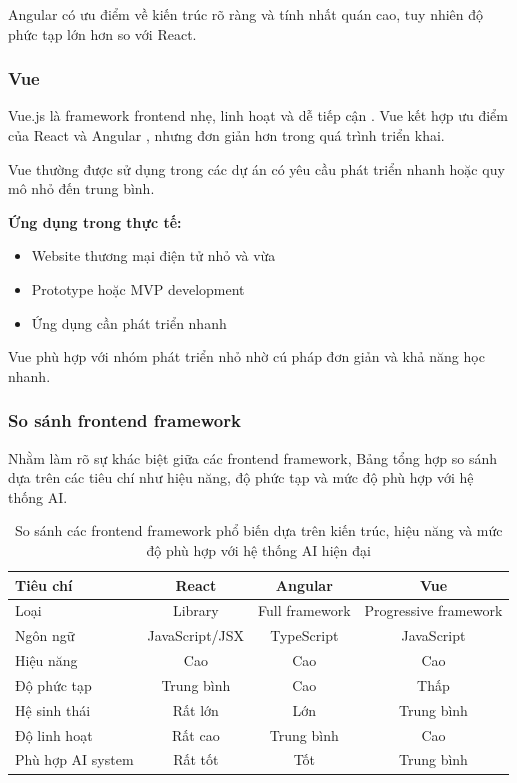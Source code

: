 Angular có ưu điểm về kiến trúc rõ ràng và tính nhất quán cao, tuy nhiên độ phức tạp lớn hơn so với React.

\subsubsection{Vue}

Vue.js là framework frontend nhẹ, linh hoạt và dễ tiếp cận \textcite{vuedocs2024}. Vue kết hợp ưu điểm của React  và Angular , nhưng đơn giản hơn trong quá trình triển khai.

Vue thường được sử dụng trong các dự án có yêu cầu phát triển nhanh hoặc quy mô nhỏ đến trung bình.

\textbf{Ứng dụng trong thực tế:}
\begin{itemize}
    \item Website thương mại điện tử nhỏ và vừa
    \item Prototype hoặc MVP development
    \item Ứng dụng cần phát triển nhanh
\end{itemize}

Vue phù hợp với nhóm phát triển nhỏ nhờ cú pháp đơn giản và khả năng học nhanh.

\subsubsection{So sánh frontend framework}

Nhằm làm rõ sự khác biệt giữa các frontend framework, Bảng  tổng hợp so sánh dựa trên các tiêu chí như hiệu năng, độ phức tạp và mức độ phù hợp với hệ thống AI.

\begin{table}[H]
\centering
\caption{So sánh các frontend framework phổ biến dựa trên kiến trúc, hiệu năng và mức độ phù hợp với hệ thống AI hiện đại}
\label{tab:frontend_framework_comparison}
\renewcommand{\arraystretch}{1.3}

\begin{tabular}{@{}lccc@{}}
\toprule
\textbf{Tiêu chí} & \textbf{React} & \textbf{Angular} & \textbf{Vue} \\
\midrule
Loại & Library & Full framework & Progressive framework \\
Ngôn ngữ & JavaScript/JSX & TypeScript & JavaScript \\
Hiệu năng & Cao & Cao & Cao \\
Độ phức tạp & Trung bình & Cao & Thấp \\
Hệ sinh thái & Rất lớn & Lớn & Trung bình \\
Độ linh hoạt & Rất cao & Trung bình & Cao \\
Phù hợp AI system & Rất tốt & Tốt & Trung bình \\
\bottomrule
\end{tabular}
\end{table}

